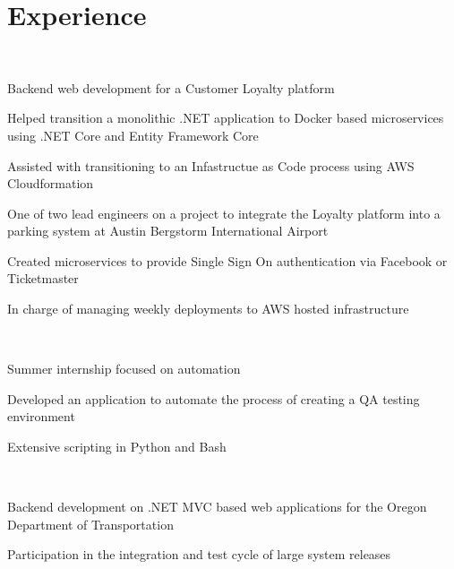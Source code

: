 \documentclass[]{hieudo-build}
\begin{document}
\hfill
\begin{minipage}[t]{0.69\textwidth} 

\section{Experience}

\\
\vspace{0.9em} %
\begin{tightemize}
\item Backend web development for a Customer Loyalty platform
\item Helped transition a monolithic .NET application to Docker based microservices using .NET Core and Entity Framework Core
\item Assisted with transitioning to an Infastructue as Code process using AWS Cloudformation
\item One of two lead engineers on a project to integrate the Loyalty platform into a parking system at Austin Bergstorm International Airport
\item Created microservices to provide Single Sign On authentication via Facebook or Ticketmaster
\item In charge of managing weekly deployments to AWS hosted infrastructure
\end{tightemize}

\sectionsep

 \\
\begin{tightemize}
\item Summer internship focused on automation
\item Developed an application to automate the process of creating a QA testing environment
\item Extensive scripting in Python and Bash
\end{tightemize}

\sectionsep

 \\
\begin{tightemize}
\item Backend development on .NET MVC based web applications for the Oregon Department of Transportation
\item Participation in the integration
and test cycle of large system releases
\end{tightemize}
\sectionsep



\end{minipage}
\end{document}

